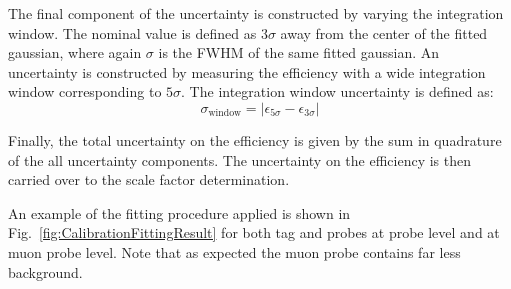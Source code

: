 The final component of the uncertainty is constructed by varying the integration window. The nominal value is defined as $3\sigma$ away from the center of the fitted gaussian, where again $\sigma$ is the FWHM of the same fitted gaussian. An uncertainty is constructed by measuring the efficiency with a wide integration window corresponding to $5\sigma$. The integration window uncertainty is defined as:
%
\begin{equation*}
  \sigma_{\textrm{window}} = |\epsilon_{5\sigma}-\epsilon_{3\sigma}|
\end{equation*}

Finally, the total uncertainty on the efficiency is given by the sum in quadrature of the all uncertainty components. The uncertainty on the efficiency is then carried over to the scale factor determination.

An example of the fitting procedure applied is shown in Fig.~\ref{fig:CalibrationFittingResult} for both tag and probes at probe level and at muon probe level. Note that as expected the muon probe contains far less background.

